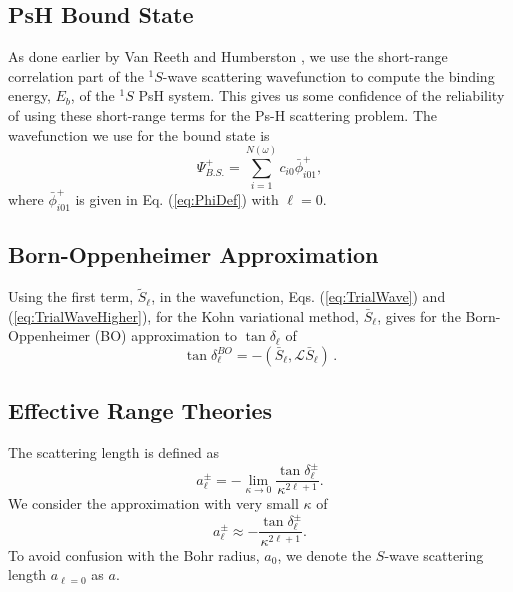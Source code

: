 \documentclass[preprint,showpacs,showkeys,preprintnumbers,amsmath,amssymb,longbibliography,pra,aps]{revtex4-1}
\begin{document}
{\subsection{PsH Bound State}
As done earlier by Van Reeth and Humberston \cite{VanReeth2003,VanReeth2004},
we use the short-range correlation part of the $^1S$-wave scattering wavefunction
to compute the binding energy, $E_b$, of the $^1S$ PsH system. This gives us
some confidence of the reliability of using these short-range terms for the Ps-H 
scattering problem. The wavefunction we use for the bound state is
\begin{equation}
\label{eq:BoundWavefn}
\Psi_{B.S.}^+ = \sum_{i=1}^{N(\omega)} c_{i0} \bar{\phi}_{i01}^+,
\end{equation}
where $\bar{\phi}_{i01}^+$ is given in Eq. (\ref{eq:PhiDef}) with
$\ell = 0$.

\subsection{Born-Oppenheimer Approximation}
Using the first term, $\widetilde{S}_\ell$, in the wavefunction,
Eqs. (\ref{eq:TrialWave}) and (\ref{eq:TrialWaveHigher}), for
the Kohn variational method, $\bar S_\ell$, gives for the
Born-Oppenheimer (BO) approximation to $\tan\delta_\ell$ of
\begin{equation}
\label{eq:Born}
\tan\delta_\ell^{BO} = -(\bar{S}_\ell,\mathcal{L}\bar{S}_\ell)\,.
\end{equation}


\subsection{Effective Range Theories}

The scattering length \cite{Bransden2003} is defined as
\begin{equation}
\label{eq:ScatLen}
a_\ell^\pm = -\lim_{\kappa \to 0}
  \frac{\tan{\delta_\ell^\pm}}{\kappa^{2\ell+1}}.
\end{equation}
We consider the approximation with very small $\kappa$ of
\begin{equation}
\label{eq:ScatLenApprox}
a_\ell^\pm \approx
  - \frac{\tan{\delta_\ell^\pm}}{\kappa^{2\ell+1}}.
\end{equation}
To avoid confusion with the Bohr radius, $a_0$, we denote
the $S$-wave scattering length $a_{\ell=0}$ as $a$.

}
\end{document}

